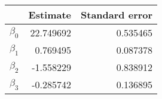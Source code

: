 \begin{tabular}{lrr}
\toprule
{} &   Estimate &  Standard error \\
\midrule
$\beta_0$ &  22.749692 &        0.535465 \\
$\beta_1$ &   0.769495 &        0.087378 \\
$\beta_2$ &  -1.558229 &        0.838912 \\
$\beta_3$ &  -0.285742 &        0.136895 \\
\bottomrule
\end{tabular}

